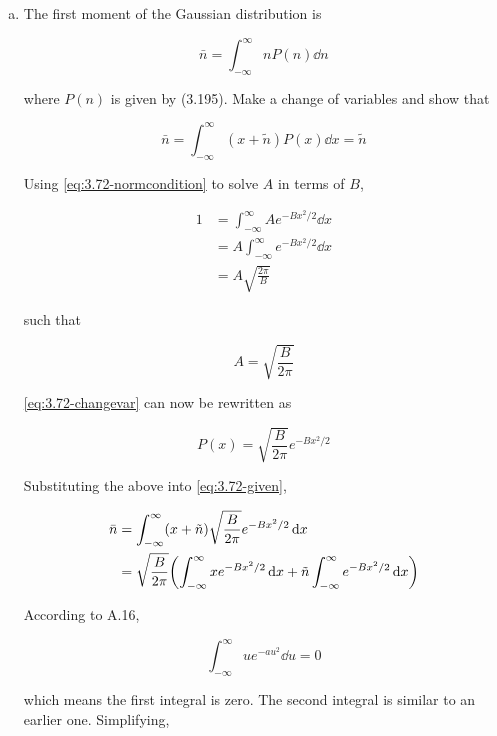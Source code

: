 \documentclass[9pt,a4paper,twocolumn]{article}
\begin{document}
\begin{enumerate}[(a)]

\item The first moment of the Gaussian distribution is

\begin{equation}
	\bar{n} = \int_{-\infty}^\infty nP(n) \dd{n}
\end{equation}

where $P(n)$ is given by (3.195). Make a change of variables and show that

\begin{equation}
	\bar{n} = \int_{-\infty}^\infty (x+\tilde{n})P(x)\dd{x} = \tilde{n} \label{eq:3.72-given}
\end{equation}

Using \eqref{eq:3.72-normcondition} to solve $A$ in terms of $B$,

\begin{align}
	1 &= \int_{-\infty}^\infty Ae^{-Bx^2/2} \dd{x} \\
	&= A\int_{-\infty}^\infty e^{-Bx^2/2} \dd{x} \\
	&= A\sqrt{\frac{2\pi}{B}}
\end{align}

such that

\begin{equation}
	A = \sqrt{\frac{B}{2\pi}}
\end{equation}

\eqref{eq:3.72-changevar} can now be rewritten as

\begin{equation}
	P(x) = \sqrt{\frac{B}{2\pi}} e^{-Bx^2/2} \label{eq:3.72-recast}
\end{equation}

Substituting the above into \eqref{eq:3.72-given},

\begin{align}
	\bar{n} &= \int_{-\infty}^\infty (x+\tilde{n})\sqrt{\frac{B}{2\pi}} e^{-Bx^2/2} \dd{x} \\
	&= \sqrt{\frac{B}{2\pi}}\qty(\int_{-\infty}^\infty xe^{-Bx^2/2}\dd{x} + \tilde{n} \int_{-\infty}^\infty e^{-Bx^2/2}\dd{x}) \nonumber
\end{align}

According to A.16,

\begin{equation}
	\int_{-\infty}^\infty ue^{-au^2} \dd{u} = 0
\end{equation}

which means the first integral is zero. The second integral is similar to an earlier one. Simplifying,


\end{enumerate}
\end{document}
